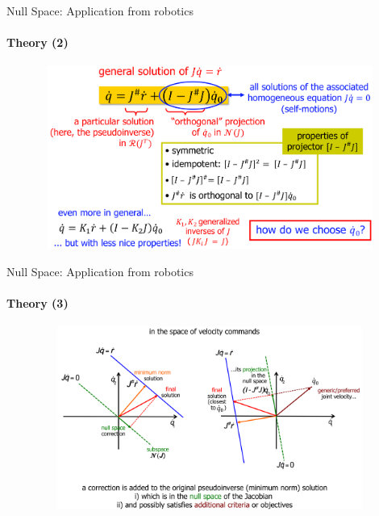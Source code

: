 \documentclass[aspectratio=169]{beamer}
\begin{document}
\begin{frame}[t]{Null Space: Application from robotics}
    \framesubtitle{Theory (2)}
    \vspace{-0.6cm}
    \begin{figure}[H]
        \centering\includegraphics[height=6cm,width=1\textwidth,keepaspectratio]{rob_app_general_idea.png}
        \label{fig:rob_app_general_idea.png}
    \end{figure}
\end{frame}

\begin{frame}[t]{Null Space: Application from robotics}
    \framesubtitle{Theory (3)}
    \vspace{-0.6cm}
    \begin{figure}[H]
        \centering\includegraphics[height=6cm,width=1\textwidth,keepaspectratio]{rob_app_geometry.png}
        \label{fig:rob_app_geometry.png}
    \end{figure}
\end{frame}
\end{document}

